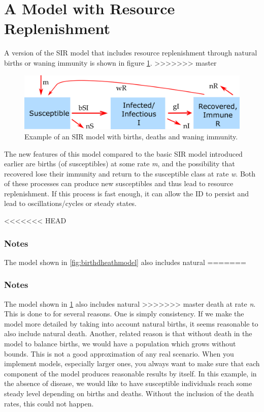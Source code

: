 \documentclass[]{book}
\theoremstyle{definition}
\theoremstyle{definition}
\theoremstyle{definition}
\theoremstyle{remark}
\begin{document}
\section{A Model with Resource
Replenishment}\label{a-model-with-resource-replenishment}

A version of the SIR model that includes resource replenishment through
natural births or waning immunity is shown in figure
\ref{fig:birthdeathdmodel}.
>>>>>>> master

\begin{figure}
\centering
\includegraphics{./images/R0modelfigure.png}
\caption{\label{fig:birthdeathdmodel}Example of an SIR model with births,
deaths and waning immunity.}
\end{figure}

The new features of this model compared to the basic SIR model
introduced earlier are births (of susceptibles) at some rate \emph{m},
and the possibility that recovered lose their immunity and return to the
susceptible class at rate \emph{w}. Both of these processes can produce
new susceptibles and thus lead to resource replenishment. If this
process is fast enough, it can allow the ID to persist and lead to
oscillations/cycles or steady states.

<<<<<<< HEAD
\hypertarget{mynotebox}{%
\subsubsection{Notes}\label{mynotebox}}

The model shown in \ref{fig:birthdheathmodel} also includes natural
=======
\subsubsection{Notes}\label{mynotebox}

The model shown in \ref{fig:birthdeathdmodel} also includes natural
>>>>>>> master
death at rate \emph{n}. This is done to for several reasons. One is
simply consistency. If we make the model more detailed by taking into
account natural births, it seems reasonable to also include natural
death. Another, related reason is that without death in the model to
balance births, we would have a population which grows without bounds.
This is not a good approximation of any real scenario. When you
implement models, especially larger ones, you always want to make sure
that each component of the model produces reasonable results by itself.
In this example, in the absence of disease, we would like to have
susceptible individuals reach some steady level depending on births and
deaths. Without the inclusion of the death rates, this could not happen.
\end{document}
